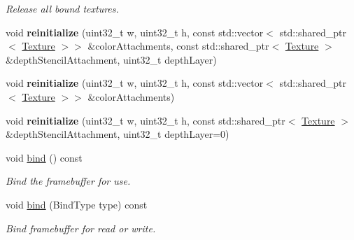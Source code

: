 \begin{Indent}
\begin{DoxyCompactItemize}
\begin{DoxyCompactList}\small\item\em Release all bound textures. \end{DoxyCompactList}\item 
\mbox{\label{classrev_1_1_frame_buffer_a747a55f98abeab1977b3b53be04413e5}} 
void {\bfseries reinitialize} (uint32\+\_\+t w, uint32\+\_\+t h, const std\+::vector$<$ std\+::shared\+\_\+ptr$<$ \mbox{\hyperlink{classrev_1_1_texture}{Texture}} $>$$>$ \&color\+Attachments, const std\+::shared\+\_\+ptr$<$ \mbox{\hyperlink{classrev_1_1_texture}{Texture}} $>$ \&depth\+Stencil\+Attachment, uint32\+\_\+t depth\+Layer)
\item 
\mbox{\label{classrev_1_1_frame_buffer_aada0aa1f32f340340682d8671826fd36}} 
void {\bfseries reinitialize} (uint32\+\_\+t w, uint32\+\_\+t h, const std\+::vector$<$ std\+::shared\+\_\+ptr$<$ \mbox{\hyperlink{classrev_1_1_texture}{Texture}} $>$$>$ \&color\+Attachments)
\item 
\mbox{\label{classrev_1_1_frame_buffer_a3b1ef6dcb06964641444fef874ed72f6}} 
void {\bfseries reinitialize} (uint32\+\_\+t w, uint32\+\_\+t h, const std\+::shared\+\_\+ptr$<$ \mbox{\hyperlink{classrev_1_1_texture}{Texture}} $>$ \&depth\+Stencil\+Attachment, uint32\+\_\+t depth\+Layer=0)
\item 
\mbox{\label{classrev_1_1_frame_buffer_a689604d6989f03b29a92f9ddc90501cc}} 
void \mbox{\hyperlink{classrev_1_1_frame_buffer_a689604d6989f03b29a92f9ddc90501cc}{bind}} () const
\begin{DoxyCompactList}\small\item\em Bind the framebuffer for use. \end{DoxyCompactList}\item 
\mbox{\label{classrev_1_1_frame_buffer_ad43a35f11c310167a81054eff41d90d6}} 
void \mbox{\hyperlink{classrev_1_1_frame_buffer_ad43a35f11c310167a81054eff41d90d6}{bind}} (Bind\+Type type) const
\begin{DoxyCompactList}\small\item\em Bind framebuffer for read or write. \end{DoxyCompactList}\item 

\end{DoxyCompactItemize}
\end{Indent}
